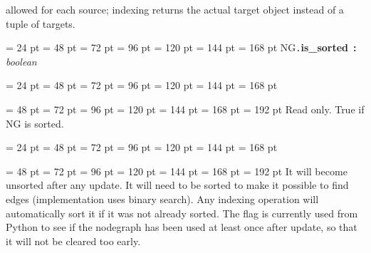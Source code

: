 {{{{allowed for each source; indexing returns the actual target object
instead of a tuple of targets.
\par}
\par}
\par}
{\par \noindent  \leftskip = 24 pt  \leftmargini = 48 pt  \leftmarginii = 72 pt  \leftmarginiii = 96 pt  \leftmarginiv = 120 pt  \leftmarginv = 144 pt  \leftmarginvi = 168 pt NG{\tt .\/}{\bf {\large {\bf is{\_}sorted\/}}\/}~{\bf :}  {\em boolean\/}\par}
{\par \noindent  \leftskip = 24 pt  \leftmargini = 48 pt  \leftmarginii = 72 pt  \leftmarginiii = 96 pt  \leftmarginiv = 120 pt  \leftmarginv = 144 pt  \leftmarginvi = 168 pt {\par \noindent
{\par \noindent  \leftskip = 48 pt  \leftmargini = 72 pt  \leftmarginii = 96 pt  \leftmarginiii = 120 pt  \leftmarginiv = 144 pt  \leftmarginv = 168 pt  \leftmarginvi = 192 pt  Read only. True if NG is sorted.
\par}
\par}
\par}
{\par \noindent  \leftskip = 24 pt  \leftmargini = 48 pt  \leftmarginii = 72 pt  \leftmarginiii = 96 pt  \leftmarginiv = 120 pt  \leftmarginv = 144 pt  \leftmarginvi = 168 pt {\par \noindent
{\par \noindent  \leftskip = 48 pt  \leftmargini = 72 pt  \leftmarginii = 96 pt  \leftmarginiii = 120 pt  \leftmarginiv = 144 pt  \leftmarginv = 168 pt  \leftmarginvi = 192 pt  It will become unsorted after any update. It will need to be
sorted to make it possible to find edges (implementation uses binary
search). Any indexing operation will automatically sort it if it was
not already sorted.  The flag is currently used from Python to see if
the nodegraph has been used at least once after update, so that it
will not be cleared too early.
\par}
\par}
\par}
\par}
